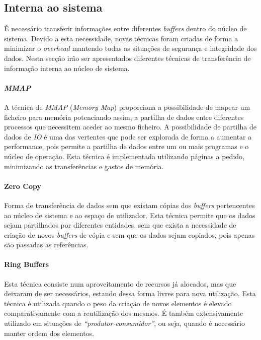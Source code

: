 \subsection{Interna ao sistema}

É necessário transferir informações entre diferentes \textit{buffers} dentro do núcleo de sistema.
Devido a esta necessidade, novas técnicas foram criadas de forma a minimizar o \textit{overhead} mantendo todas as situações de segurança e integridade dos dados.
Nesta secção irão ser apresentados diferentes técnicas de transferência de informação interna ao núcleo de sistema.

\paragraph*{\textit{MMAP}}\label{par:MMAP_overview}
A técnica de \textit{MMAP} (\textit{Memory Map}) proporciona a possibilidade de mapear um ficheiro para memória potenciando assim, a partilha de dados entre diferentes processos que necessitem aceder ao mesmo ficheiro.
A possibilidade de partilha de dados de \textit{IO} é uma das vertentes que pode ser explorada de forma a aumentar a performance, pois permite a partilha de dados entre um ou mais programas e o núcleo de operação.
Esta técnica é implementada utilizando páginas a pedido, minimizando as transferências e gastos de memória.

\paragraph*{Zero Copy}\label{par:zero_copy_overview}

Forma de transferência de dados sem que existam cópias dos \textit{buffers} pertencentes ao núcleo de sistema e ao espaço de utilizador.
Esta técnica permite que os dados sejam partilhados por diferentes entidades, sem que exista a necessidade de criação de novos \textit{buffers} de cópia e sem que os dados sejam copiados, pois apenas são passadas as referências.

\paragraph*{Ring Buffers}\label{c}
Esta técnica consiste num aproveitamento de recursos já alocados, mas que deixaram de ser necessários, estando dessa forma livres para nova utilização.
Esta técnica é utilizada quando o peso da criação de novos elementos é elevado comparativamente com a reutilização dos mesmos.
É também extensivamente utilizado em situações de \textit{``produtor-consumidor''}, ou seja, quando é necessário manter ordem dos elementos.

